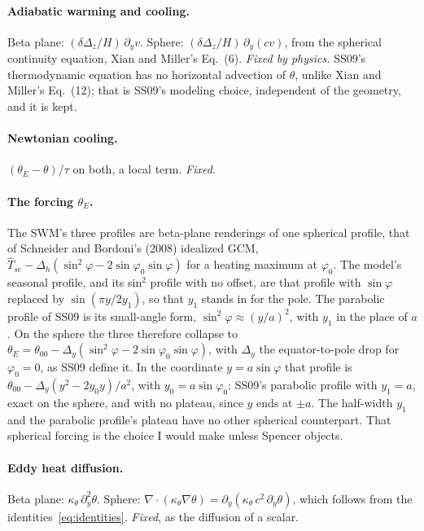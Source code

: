\documentclass[11pt]{article}
\begin{document}
\paragraph{Adiabatic warming and cooling.} Beta plane:
$(\delta\Delta_z/H)\,\partial_y v$. Sphere: $(\delta\Delta_z/H)\,\partial_y(cv)$,
from the spherical continuity equation, Xian and Miller's Eq.~(6).
\emph{Fixed by physics.} SS09's thermodynamic equation has no horizontal
advection of $\theta$, unlike Xian and Miller's Eq.~(12); that is SS09's
modeling choice, independent of the geometry, and it is kept.

\paragraph{Newtonian cooling.} $(\theta_E - \theta)/\tau$ on both, a local term.
\emph{Fixed.}

\paragraph{The forcing $\theta_E$.} The SWM's three profiles are beta-plane
renderings of one spherical profile, that of Schneider and Bordoni's (2008)
idealized GCM, $\hat{T}_{se} - \Delta_h(\sin^2\varphi - 2\sin\varphi_0
\sin\varphi)$ for a heating maximum at $\varphi_0$. The model's seasonal profile,
and its sin$^2$ profile with no offset, are that profile with $\sin\varphi$
replaced by $\sin(\pi y/2y_1)$, so that $y_1$ stands in for the pole. The
parabolic profile of SS09 is its small-angle form,
$\sin^2\varphi \approx (y/a)^2$, with $y_1$ in the place of $a$. On the sphere the three therefore collapse to
$\theta_E = \theta_{00} - \Delta_y(\sin^2\varphi - 2\sin\varphi_0\sin\varphi)$,
with $\Delta_y$ the equator-to-pole drop for $\varphi_0 = 0$, as SS09 define it.
In the coordinate $y = a\sin\varphi$ that profile is
$\theta_{00} - \Delta_y(y^2 - 2y_0 y)/a^2$, with $y_0 = a\sin\varphi_0$: SS09's
parabolic profile with $y_1 = a$, exact on the sphere, and with no plateau,
since $y$ ends at $\pm a$. The half-width
$y_1$ and the parabolic profile's plateau have no other spherical
counterpart. That spherical forcing is the choice I would make unless Spencer
objects.

\paragraph{Eddy heat diffusion.} Beta plane: $\kappa_\theta\,\partial_y^2\theta$.
Sphere: $\nabla\cdot(\kappa_\theta\nabla\theta) =
\partial_y(\kappa_\theta\,c^2\,\partial_y\theta)$, which follows from the
identities~\eqref{eq:identities}. \emph{Fixed}, as the diffusion of a scalar.
\end{document}
